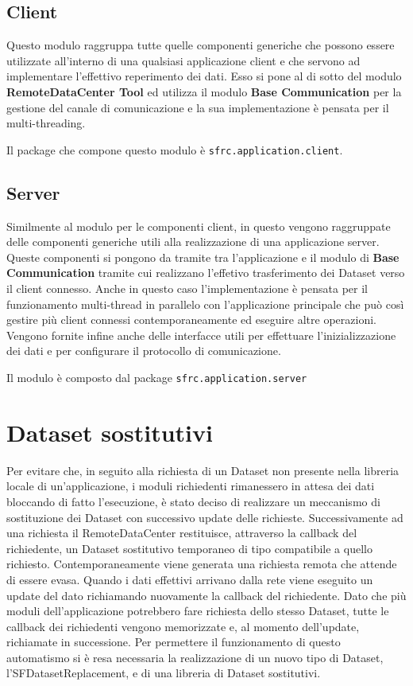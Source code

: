 \subsection{Client}
\label{sub:clientmodule}
Questo modulo raggruppa tutte quelle componenti generiche che possono essere utilizzate all'interno di una qualsiasi applicazione client e che servono ad implementare l'effettivo reperimento dei dati. 
Esso si pone al di sotto del modulo \textbf{RemoteDataCenter Tool} ed utilizza il modulo \textbf{Base Communication} per la gestione del canale di comunicazione e la sua implementazione è pensata per il multi-threading.

Il package che compone questo modulo è \texttt{sfrc.application.client}.

\subsection{Server}
\label{sub:servermodule}
Similmente al modulo per le componenti client, in questo vengono raggruppate delle componenti generiche utili alla realizzazione di una applicazione server. Queste componenti si pongono da tramite tra l'applicazione e il modulo di \textbf{Base Communication} tramite cui realizzano l'effetivo trasferimento dei Dataset verso il client connesso.
Anche in questo caso l'implementazione è pensata per il funzionamento multi-thread in parallelo con l'applicazione principale che può così gestire più client connessi contemporaneamente ed eseguire altre operazioni.
Vengono fornite infine anche delle interfacce utili per effettuare l'inizializzazione dei dati e per configurare il protocollo di comunicazione.

Il modulo è composto dal package \texttt{sfrc.application.server}

\section{Dataset sostitutivi}
\label{sec:dataset_sost}
Per evitare che, in seguito alla richiesta di un Dataset non presente nella libreria locale di un'applicazione, i moduli richiedenti rimanessero in attesa dei dati bloccando di fatto l'esecuzione, è stato deciso di realizzare un meccanismo di sostituzione dei Dataset con successivo update delle richieste.
Successivamente ad una richiesta il RemoteDataCenter restituisce, attraverso la callback del richiedente, un Dataset sostitutivo temporaneo di tipo compatibile a quello richiesto.
Contemporaneamente viene generata una richiesta remota che attende di essere evasa. Quando i dati effettivi arrivano dalla rete viene eseguito un update del dato richiamando nuovamente la callback del richiedente.
Dato che più moduli dell'applicazione potrebbero fare richiesta dello stesso Dataset, tutte le callback dei richiedenti vengono memorizzate e, al momento dell'update, richiamate in successione.
Per permettere il funzionamento di questo automatismo si è resa necessaria la realizzazione di un nuovo tipo di Dataset, l'SFDatasetReplacement, e di una libreria di Dataset sostitutivi.

